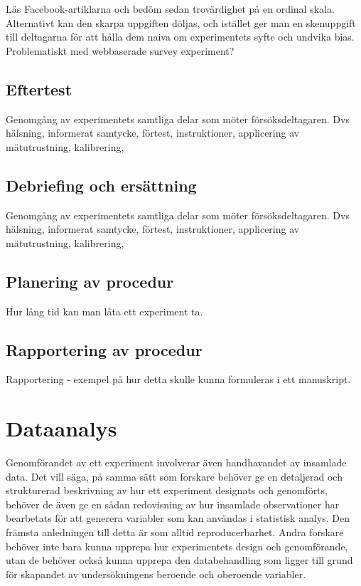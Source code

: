 \documentclass[
]{book}
\begin{document}
Läs Facebook-artiklarna och bedöm sedan trovärdighet på en ordinal skala. Alternativt kan den skarpa uppgiften döljas, och istället ger man en skenuppgift till deltagarna för att hålla dem naiva om experimentets syfte och undvika bias. Problematiskt med webbaserade survey experiment?

\hypertarget{sub07.6.6}{%
\subsection{Eftertest}\label{sub07.6.6}}

Genomgång av experimentets samtliga delar som möter försöksdeltagaren. Dvs hälsning, informerat samtycke, förtest, instruktioner, applicering av mätutrustning, kalibrering,

\hypertarget{sub07.6.7}{%
\subsection{Debriefing och ersättning}\label{sub07.6.7}}

Genomgång av experimentets samtliga delar som möter försöksdeltagaren. Dvs hälsning, informerat samtycke, förtest, instruktioner, applicering av mätutrustning, kalibrering,

\hypertarget{sub07.6.8}{%
\subsection{Planering av procedur}\label{sub07.6.8}}

Hur lång tid kan man låta ett experiment ta.

\hypertarget{sub07.6.9}{%
\subsection{Rapportering av procedur}\label{sub07.6.9}}

Rapportering - exempel på hur detta skulle kunna formuleras i ett manuskript.

\hypertarget{sec07.7}{%
\section{Dataanalys}\label{sec07.7}}

Genomförandet av ett experiment involverar även handhavandet av insamlade data. Det vill säga, på samma sätt som forskare behöver ge en detaljerad och strukturerad beskrivning av hur ett experiment designats och genomförts, behöver de även ge en sådan redovisning av hur insamlade observationer har bearbetats för att generera variabler som kan användas i statistisk analys. Den främsta anledningen till detta är som alltid reproducerbarhet. Andra forskare behöver inte bara kunna upprepa hur experimentets design och genomförande, utan de behöver också kunna upprepa den databehandling som ligger till grund för skapandet av undersökningens beroende och oberoende variabler.
\end{document}
